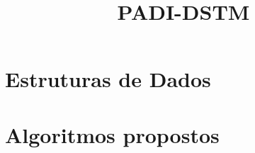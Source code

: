 \documentclass[times, 10pt,twocolumn]{article}
\begin{document}
\title{PADI-DSTM}

\maketitle
\thispagestyle{empty}








\section{Estruturas de Dados}











\section{Algoritmos propostos}










\nocite{ex1,ex2}


\end{document}
